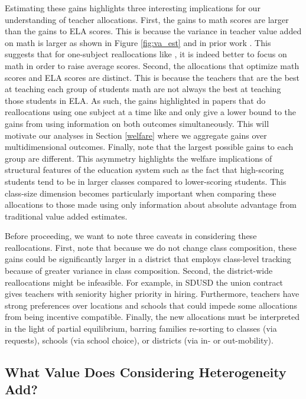 \documentclass[12pt]{article}
\theoremstyle{definition}
\theoremstyle{definition}
\theoremstyle{definition}
\theoremstyle{definition}
\begin{document}
Estimating these gains highlights three interesting implications for our understanding of teacher allocations. First, the gains to math scores are larger than the gains to ELA scores. This is because the variance in teacher value added on math is larger as shown in Figure \ref{fig:va_est} and in prior work \citep[e.g.,][]{chetty2014measuring1}. This suggests that for one-subject reallocations like \citet{bates2022teacher}, it is indeed better to focus on math in order to raise average scores. Second, the allocations that optimize math scores and ELA scores are distinct. This is because the teachers that are the best at teaching each group of students math are not always the best at teaching those students in ELA. As such, the gains highlighted in papers that do reallocations using one subject at a time like \citet{Delgado2020} and \citet{bates2022teacher} only give a lower bound to the gains from using information on both outcomes simultaneously. This will motivate our analyses in Section \ref{welfare} where we aggregate gains over multidimensional outcomes. Finally, note that the largest possible gains to each group are different. This asymmetry highlights the welfare implications of structural features of the education system such as the fact that high-scoring students tend to be in larger classes compared to lower-scoring students. This class-size dimension becomes particularly important when comparing these allocations to those made using only information about absolute advantage from traditional value added estimates.

Before proceeding, we want to note three caveats in considering these reallocations. First, note that because we do not change class composition, these gains could be significantly larger in a district that employs class-level tracking because of greater variance in class composition. Second, the district-wide reallocations might be infeasible. For example, in SDUSD the union contract gives teachers with seniority higher priority in hiring. Furthermore, teachers have strong preferences over locations \citep{boyd2005a} and schools \citep{bates2022teacher} that could impede some allocations from being incentive compatible. Finally, the new allocations must be interpreted in the light of partial equilibrium, barring families re-sorting to classes (via requests), schools (via school choice), or districts (via in- or out-mobility).

\subsection{What Value Does Considering Heterogeneity Add?}
\label{considering heterogeneity}
\end{document}
